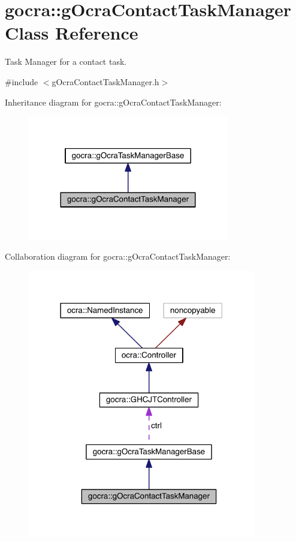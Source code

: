 \hypertarget{classgocra_1_1gOcraContactTaskManager}{}\section{gocra\+:\+:g\+Ocra\+Contact\+Task\+Manager Class Reference}
\label{classgocra_1_1gOcraContactTaskManager}


Task Manager for a contact task.  




{\ttfamily \#include $<$g\+Ocra\+Contact\+Task\+Manager.\+h$>$}



Inheritance diagram for gocra\+:\+:g\+Ocra\+Contact\+Task\+Manager\+:\nopagebreak
\begin{figure}[H]
\begin{center}
\leavevmode
\includegraphics[width=248pt]{d3/d01/classgocra_1_1gOcraContactTaskManager__inherit__graph}
\end{center}
\end{figure}


Collaboration diagram for gocra\+:\+:g\+Ocra\+Contact\+Task\+Manager\+:\nopagebreak
\begin{figure}[H]
\begin{center}
\leavevmode
\includegraphics[width=282pt]{dd/d38/classgocra_1_1gOcraContactTaskManager__coll__graph}
\end{center}
\end{figure}
